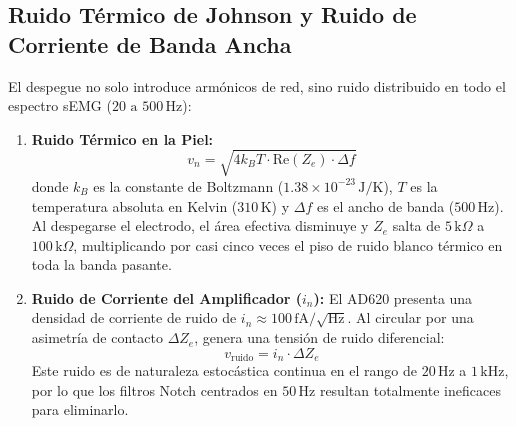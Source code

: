 \documentclass[11pt,a4paper]{article}
\begin{document}
\subsection{Ruido Térmico de Johnson y Ruido de Corriente de Banda Ancha}
El despegue no solo introduce armónicos de red, sino ruido distribuido en todo el espectro sEMG ($20\text{ a }500\,\text{Hz}$):
\begin{enumerate}
    \item \textbf{Ruido Térmico en la Piel:}  
    \begin{equation}
    v_n = \sqrt{4 k_B T \cdot \text{Re}(Z_e) \cdot \Delta f}
    \end{equation}
    donde $k_B$ es la constante de Boltzmann ($1.38 \times 10^{-23}\,\text{J/K}$), $T$ es la temperatura absoluta en Kelvin ($310\,\text{K}$) y $\Delta f$ es el ancho de banda ($500\,\text{Hz}$). Al despegarse el electrodo, el área efectiva disminuye y $Z_e$ salta de $5\,\text{k}\Omega$ a $100\,\text{k}\Omega$, multiplicando por casi cinco veces el piso de ruido blanco térmico en toda la banda pasante.
    \item \textbf{Ruido de Corriente del Amplificador ($i_n$):}  
    El AD620 presenta una densidad de corriente de ruido de $i_n \approx 100\,\text{fA}/\sqrt{\text{Hz}}$. Al circular por una asimetría de contacto $\Delta Z_e$, genera una tensión de ruido diferencial:
    \begin{equation}
    v_{\text{ruido}} = i_n \cdot \Delta Z_e
    \end{equation}
    Este ruido es de naturaleza estocástica continua en el rango de $20\,\text{Hz}$ a $1\,\text{kHz}$, por lo que los filtros Notch centrados en $50\,\text{Hz}$ resultan totalmente ineficaces para eliminarlo.
\end{enumerate}
\end{document}

